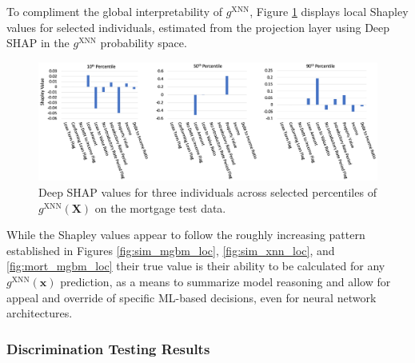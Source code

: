 \documentclass[information,article,submit,moreauthors,pdftex]{definitions/mdpi}
\begin{document}
To compliment the global interpretability of $g^\text{XNN}$, Figure \ref{fig:mort_xnn_loc} displays local Shapley values for selected individuals, estimated from the projection layer using Deep SHAP in the $g^\text{XNN}$ probability space. 

\begin{figure}[H]
\centering
\includegraphics[width=16cm]{img/mort_xnn_loc.png}
\caption{Deep SHAP values for three individuals across selected percentiles of $g^\text{XNN}(\mathbf{X})$ on the mortgage test data.}
\label{fig:mort_xnn_loc}
\end{figure}

\noindent While the Shapley values appear to follow the roughly increasing pattern established in Figures \ref{fig:sim_mgbm_loc}, \ref{fig:sim_xnn_loc}, and \ref{fig:mort_mgbm_loc} their true value is their ability to be calculated for any $g^\text{XNN}(\mathbf{x})$ prediction, as a means to summarize model reasoning and allow for appeal and override of specific ML-based decisions, even for neural network architectures. 

\subsubsection{Discrimination Testing Results}\label{ssec:dis_mort}
\end{document}
